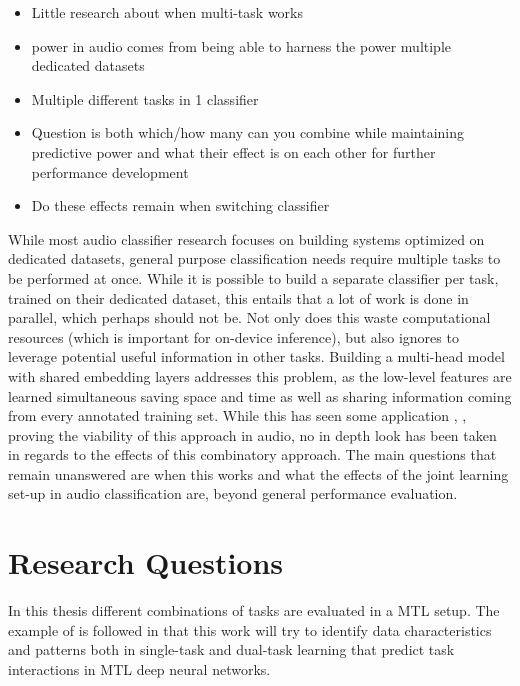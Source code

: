 \begin{itemize}
	\item Little research about when multi-task works
	\item power in audio comes from being able to harness the power multiple dedicated datasets
	\item Multiple different tasks in 1 classifier
	\item Question is both which/how many can you combine while maintaining predictive power and what their effect is on each other for further performance development
	\item Do these effects remain when switching classifier
\end{itemize}

While most audio classifier research focuses on building systems optimized on dedicated datasets, general purpose classification needs require multiple tasks to be performed at once. While it is possible to build a separate classifier per task, trained on their dedicated dataset, this entails that a lot of work is done in parallel, which perhaps should not be. Not only does this waste computational resources (which is important for on-device inference), but also ignores to leverage potential useful information in other tasks. Building a multi-head model with shared embedding layers addresses this problem, as the low-level features are learned simultaneous saving space and time as well as sharing information coming from every annotated training set. While this has seen some application \citep{tagliasacchi2020multi}, \citep{georgiev2017heterogeneous}, \citep{lee2019label} proving the viability of this approach in audio, no in depth look has been taken in regards to the effects of this combinatory approach. The main questions that remain unanswered are when this works and what the effects of the joint learning set-up in audio classification are, beyond general performance evaluation.

\section{Research Questions}

In this thesis different combinations of tasks are evaluated in a MTL setup. The example of \citep{bingel2017identifying} is followed in that this work will try to identify data characteristics and patterns both in single-task and dual-task learning that predict task interactions in MTL deep neural networks. 


